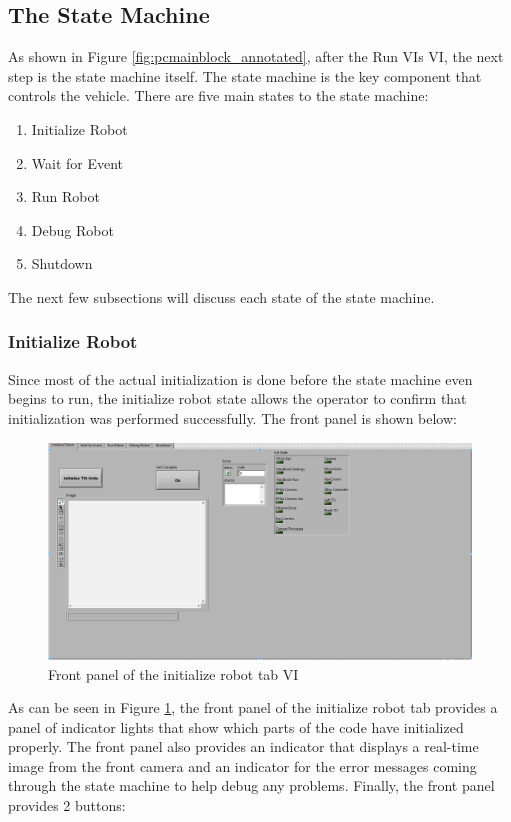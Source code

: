 \subsection{The State Machine}

As shown in Figure \ref{fig:pcmainblock_annotated}, after the Run VIs VI, the next step is the state machine itself. The state machine is the key component that controls the vehicle. There are five main states to the state machine:

\begin{enumerate}
\item Initialize Robot
\item Wait for Event
\item Run Robot
\item Debug Robot
\item Shutdown
\end{enumerate}

\noindent The next few subsections will discuss each state of the state machine.

\subsubsection{Initialize Robot}

Since most of the actual initialization is done before the state machine even begins to run, the initialize robot state allows the operator to confirm that initialization was performed successfully. The front panel is shown below:

\begin{figure}[h!]
\centering
\includegraphics[scale=0.35]{Photos/initrob_front.png}
\caption{Front panel of the initialize robot tab VI}
\label{fig:initrob_front}
\end{figure}

\noindent As can be seen in Figure \ref{fig:initrob_front}, the front panel of the initialize robot tab provides a panel of indicator lights that show which parts of the code have initialized properly. The front panel also provides an indicator that displays a real-time image from the front camera and an indicator for the error messages coming through the state machine to help debug any problems. Finally, the front panel provides 2 buttons:

